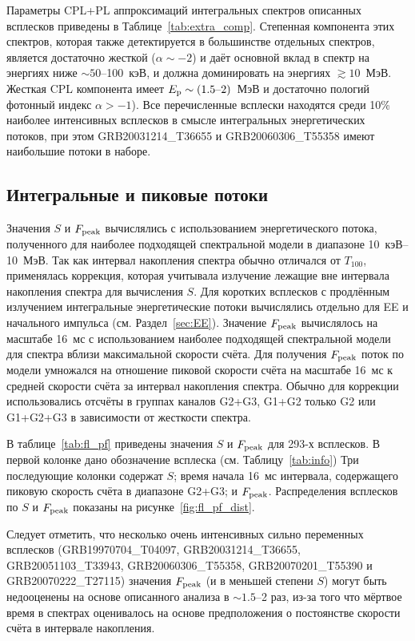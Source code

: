 Параметры CPL+PL аппроксимаций интегральных спектров описанных всплесков приведены в Таблице~\ref{tab:extra_comp}. 
Степенная компонента этих спектров, которая также детектируется в большинстве отдельных спектров,
является достаточно жесткой ($\alpha \sim -2$) и даёт основной вклад в спектр на  
энергиях ниже $\sim 50$--100~кэВ, и должна доминировать на энергиях $\gtrsim 10$~МэВ.
Жесткая CPL компонента имеет $E_{\mathrm{p}}\sim(1.5\textrm{--}2)$~МэВ и достаточно пологий
фотонный индекс $\alpha > -1$).
Все перечисленные всплески находятся среди 10\% наиболее интенсивных всплесков
в смысле интегральных энергетических потоков, при этом
GRB20031214\_T36655 и GRB20060306\_T55358 имеют наибольшие потоки в наборе.

\subsection{Интегральные и пиковые потоки}
Значения $S$ и $F_{\mathrm{peak}}$ вычислялись с использованием энергетического потока,
полученного для наиболее подходящей спектральной модели в диапазоне 10~кэВ--10~МэВ.
Так как интервал накопления спектра обычно отличался от $T_{100}$, применялась 
коррекция, которая учитывала излучение лежащие вне интервала накопления спектра 
для вычисления $S$.
Для коротких всплесков с продлённым излучением интегральные энергетические потоки 
вычислялись отдельно для EE и начального импульса (см. Раздел~\ref{sec:EE}).
Значение $F_{\mathrm{peak}}$ вычислялось на масштабе 16~мс с использованием наиболее 
подходящей спектральной модели для спектра вблизи максимальной скорости счёта.
Для получения $F_{\mathrm{peak}}$ поток по модели умножался на отношение 
пиковой скорости счёта на масштабе 16~мс к средней скорости счёта за интервал 
накопления спектра. Обычно для коррекции использовались отсчёты в группах каналов
G2+G3, G1+G2 только G2 или G1+G2+G3 в зависимости от жесткости спектра.

В таблице~\ref{tab:fl_pf} приведены значения $S$ и $F_{\mathrm{peak}}$ для 293-х всплесков.
В первой колонке дано обозначение всплеска (см. Таблицу~\ref{tab:info})
Три последующие колонки содержат $S$; время начала 16~мс интервала, содержащего
пиковую скорость счёта в диапазоне G2+G3; и $F_{\mathrm{peak}}$.
Распределения всплесков по $S$ и $F_{\mathrm{peak}}$ показаны на рисунке~\ref{fig:fl_pf_dist}.

Следует отметить, что несколько очень интенсивных сильно переменных всплесков 
(GRB19970704\_T04097, GRB20031214\_T36655, GRB20051103\_T33943, GRB20060306\_T55358,
GRB20070201\_T55390 и GRB20070222\_T27115)
значения $F_{\mathrm{peak}}$ (и в меньшей степени $S$) могут быть недооценены на основе описанного анализа
в $\sim1.5$--2 раз, из-за того что мёртвое время в спектрах оценивалось на основе предположения о 
постоянстве скорости счёта в интервале накопления.


